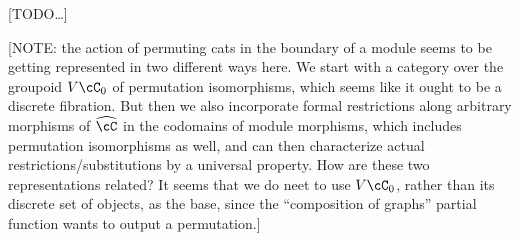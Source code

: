 \documentclass{amsart}
\newcommand{\C}{\cC}
\renewcommand{\Chat}{\ensuremath{\widehat{\C}}\xspace}
\newcommand{\E}{\cE}
\renewcommand{\o}{^{\circ}}
\begin{document}
[TODO\dots]

[NOTE: the action of permuting cats in the boundary of a module seems to be getting represented in two different ways here.
We start with a category over the groupoid $V\C_0$ of permutation isomorphisms, which seems like it ought to be a discrete fibration.
But then we also incorporate formal restrictions along arbitrary morphisms of $\Chat$ in the codomains of module morphisms, which includes permutation isomorphisms as well, and can then characterize actual restrictions/substitutions by a universal property.
How are these two representations related?
It seems that we do neet to use $V\C_0$, rather than its discrete set of objects, as the base, since the ``composition of graphs'' partial function wants to output a permutation.]




\end{document}
